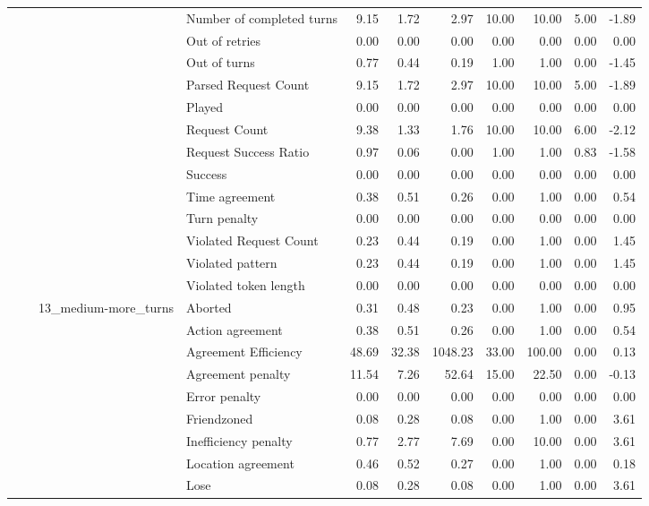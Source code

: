 \begin{tabular}{llllrrrrrrr}
 &  &  & Number of completed turns & 9.15 & 1.72 & 2.97 & 10.00 & 10.00 & 5.00 & -1.89 \\
 &  &  & Out of retries & 0.00 & 0.00 & 0.00 & 0.00 & 0.00 & 0.00 & 0.00 \\
 &  &  & Out of turns & 0.77 & 0.44 & 0.19 & 1.00 & 1.00 & 0.00 & -1.45 \\
 &  &  & Parsed Request Count & 9.15 & 1.72 & 2.97 & 10.00 & 10.00 & 5.00 & -1.89 \\
 &  &  & Played & 0.00 & 0.00 & 0.00 & 0.00 & 0.00 & 0.00 & 0.00 \\
 &  &  & Request Count & 9.38 & 1.33 & 1.76 & 10.00 & 10.00 & 6.00 & -2.12 \\
 &  &  & Request Success Ratio & 0.97 & 0.06 & 0.00 & 1.00 & 1.00 & 0.83 & -1.58 \\
 &  &  & Success & 0.00 & 0.00 & 0.00 & 0.00 & 0.00 & 0.00 & 0.00 \\
 &  &  & Time agreement & 0.38 & 0.51 & 0.26 & 0.00 & 1.00 & 0.00 & 0.54 \\
 &  &  & Turn penalty & 0.00 & 0.00 & 0.00 & 0.00 & 0.00 & 0.00 & 0.00 \\
 &  &  & Violated Request Count & 0.23 & 0.44 & 0.19 & 0.00 & 1.00 & 0.00 & 1.45 \\
 &  &  & Violated pattern & 0.23 & 0.44 & 0.19 & 0.00 & 1.00 & 0.00 & 1.45 \\
 &  &  & Violated token length & 0.00 & 0.00 & 0.00 & 0.00 & 0.00 & 0.00 & 0.00 \\
\cline{3-11}
 &  & \multirow[t]{27}{*}{13_medium-more_turns} & Aborted & 0.31 & 0.48 & 0.23 & 0.00 & 1.00 & 0.00 & 0.95 \\
 &  &  & Action agreement & 0.38 & 0.51 & 0.26 & 0.00 & 1.00 & 0.00 & 0.54 \\
 &  &  & Agreement Efficiency & 48.69 & 32.38 & 1048.23 & 33.00 & 100.00 & 0.00 & 0.13 \\
 &  &  & Agreement penalty & 11.54 & 7.26 & 52.64 & 15.00 & 22.50 & 0.00 & -0.13 \\
 &  &  & Error penalty & 0.00 & 0.00 & 0.00 & 0.00 & 0.00 & 0.00 & 0.00 \\
 &  &  & Friendzoned & 0.08 & 0.28 & 0.08 & 0.00 & 1.00 & 0.00 & 3.61 \\
 &  &  & Inefficiency penalty & 0.77 & 2.77 & 7.69 & 0.00 & 10.00 & 0.00 & 3.61 \\
 &  &  & Location agreement & 0.46 & 0.52 & 0.27 & 0.00 & 1.00 & 0.00 & 0.18 \\
 &  &  & Lose & 0.08 & 0.28 & 0.08 & 0.00 & 1.00 & 0.00 & 3.61 \\

\end{tabular}
